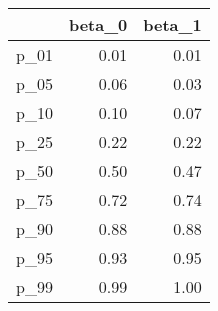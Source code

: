 \begin{table}[ht]
\centering
\begin{tabular}{rrr}
  \hline
 & beta\_0 & beta\_1 \\ 
  \hline
p\_01 & 0.01 & 0.01 \\ 
  p\_05 & 0.06 & 0.03 \\ 
  p\_10 & 0.10 & 0.07 \\ 
  p\_25 & 0.22 & 0.22 \\ 
  p\_50 & 0.50 & 0.47 \\ 
  p\_75 & 0.72 & 0.74 \\ 
  p\_90 & 0.88 & 0.88 \\ 
  p\_95 & 0.93 & 0.95 \\ 
  p\_99 & 0.99 & 1.00 \\ 
   \hline
\end{tabular}
\end{table}
